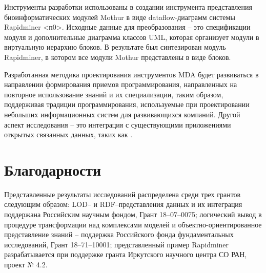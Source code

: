 \documentclass[conference]{IEEEtran} \IEEEoverridecommandlockouts
\begin{document}
Инструменты разработки использованы в создании инструмента представления биоинформатических модулей Mothur в виде dataflow-диаграмм системы Rapidminer <п0>. Исходные данные для преобразования -- это спецификации модуля и дополнительные диаграмма классов UML, которая организует модули в виртуальную иерархию блоков. В результате был синтезирован модуль Rapidminer, в котором все модули Mothur представлены в виде блоков. 

Разработанная методика проектирования инструментов MDA будет развиваться в направлении формирования приемов программирования, направленных на повторное использование знаний и их специализации, таким образом, поддерживая традиции программирования, используемые при проектировании небольших информационных систем для развивающихся компаний. Другой аспект исследования -- это интеграция с существующими приложениями открытых связанных данных, таких как \cite{digarch}. 

\section{Благодарности} \label{sec:ack-descr} 

Представленные результаты исследований распределена среди трех грантов следующим образом: LOD-- и RDF--представления данных и их интеграция поддержана Российским научным фондом, Грант 18--07--0075; логический вывод в процедуре трансформации над комплексами моделей и объектно-ориентированное представление знаний -- поддержка Российского фонда фундаментальных исследований, Грант 18--71--10001; представленный пример Rapidminer разрабатывается при поддержке гранта Иркутского научного центра СО РАН, проект № 4.2. 
\end{document}
